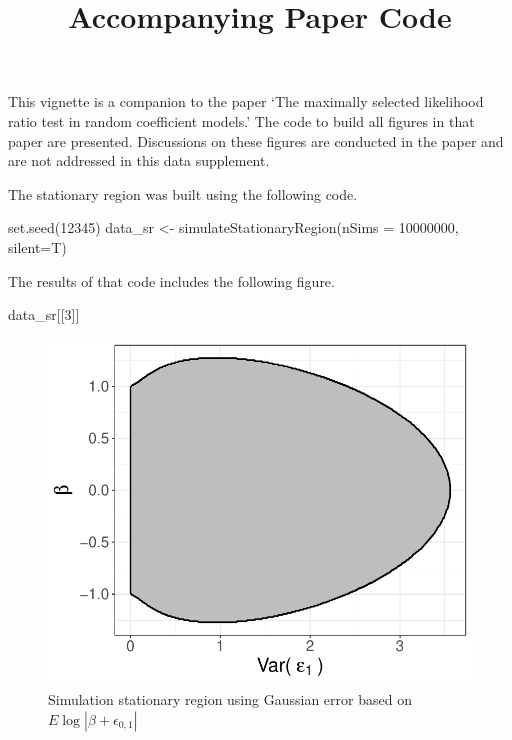 \documentclass[
]{article}
\title{Accompanying Paper Code}
\author{}
\date{\vspace{-2.5em}}
\newenvironment{Shaded}{\begin{snugshade}}{\end{snugshade}}
\newcommand{\AttributeTok}[1]{\textcolor[rgb]{0.77,0.63,0.00}{#1}}
\newcommand{\DecValTok}[1]{\textcolor[rgb]{0.00,0.00,0.81}{#1}}
\newcommand{\FunctionTok}[1]{\textcolor[rgb]{0.00,0.00,0.00}{#1}}
\newcommand{\NormalTok}[1]{#1}
\newcommand{\OtherTok}[1]{\textcolor[rgb]{0.56,0.35,0.01}{#1}}
\begin{document}
\maketitle

This vignette is a companion to the paper `The maximally selected
likelihood ratio test in random coefficient models.' The code to build
all figures in that paper are presented. Discussions on these figures
are conducted in the paper and are not addressed in this data
supplement.

The stationary region was built using the following code.

\begin{Shaded}
\begin{Highlighting}[]
\FunctionTok{set.seed}\NormalTok{(}\DecValTok{12345}\NormalTok{)}
\NormalTok{data\_sr }\OtherTok{\textless{}{-}} \FunctionTok{simulateStationaryRegion}\NormalTok{(}\AttributeTok{nSims =} \DecValTok{10000000}\NormalTok{, }\AttributeTok{silent=}\NormalTok{T)}
\end{Highlighting}
\end{Shaded}

The results of that code includes the following figure.

\begin{Shaded}
\begin{Highlighting}[]
\NormalTok{data\_sr[[}\DecValTok{3}\NormalTok{]]}
\end{Highlighting}
\end{Shaded}

\begin{figure}
\centering
\includegraphics{paperCode_files/figure-latex/plotStationaryRegion-1.pdf}
\caption{Simulation stationary region using Gaussian error based on
\(E\log |\beta + \epsilon_{0,1} |\)}
\end{figure}
\end{document}
